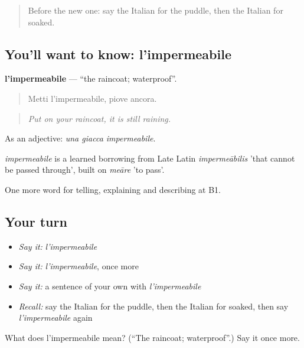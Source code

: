 \label{lesson:IT-C470-impermeabile}



\begin{quote}
Before the new one: say the Italian for the puddle, then the Italian for soaked.
\end{quote}

\subsection*{You'll want to know: l'impermeabile}
\textbf{l'impermeabile} — \textquotedblleft{}the raincoat; waterproof\textquotedblright{}.

\begin{quote}
Metti l'impermeabile, piove ancora.
\end{quote}

\begin{quote}
\emph{Put on your raincoat, it is still raining.}
\end{quote}

As an adjective: \emph{una giacca impermeabile}.

\begin{cousinweb}
\emph{impermeabile} is a learned borrowing from Late Latin \emph{impermeābilis} 'that cannot be passed through', built on \emph{meāre} 'to pass'.
\end{cousinweb}

\begin{grammarlens}[title={What you've built}]
One more word for telling, explaining and describing at B1.
\end{grammarlens}

\subsection*{Your turn}
\begin{itemize}
\raggedright
  \item \emph{Say it:} \emph{l'impermeabile}
  \item \emph{Say it:} \emph{l'impermeabile}, once more
  \item \emph{Say it:} a sentence of your own with \emph{l'impermeabile}
  \item \emph{Recall:} say the Italian for the puddle, then the Italian for soaked, then say \emph{l'impermeabile} again
\end{itemize}

\begin{tcolorbox}[breakable,colback=teal!4,colframe=teal!35!black,title={Before you move on}]
What does l'impermeabile mean? (\textquotedblleft{}The raincoat; waterproof\textquotedblright{}.) Say it once more.
\end{tcolorbox}
